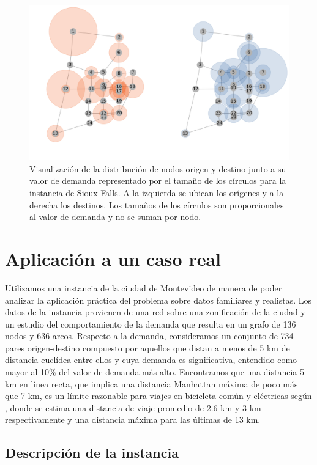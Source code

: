 \begin{figure}[h!]
  \centering
  \includegraphics[width=12cm]{../resources/sioux_falls_demand.png}
  \caption{Visualización de la distribución de nodos origen y destino junto a su valor de demanda representado por el tamaño de los círculos para la instancia de Sioux-Falls. A la izquierda se ubican los orígenes y a la derecha los destinos. Los tamaños de los círculos son proporcionales al valor de demanda y no se suman por nodo.}
  \label{fig:sioux_falls_demand}
\end{figure}

\FloatBarrier
\section{Aplicación a un caso real}

Utilizamos una instancia de la ciudad de Montevideo de manera de poder analizar la aplicación práctica del problema sobre datos familiares y realistas. Los datos de la instancia provienen de una red sobre una zonificación de la ciudad y un estudio del comportamiento de la demanda que resulta en un grafo de 136 nodos y 636 arcos. Respecto a la demanda, consideramos un conjunto de 734 pares origen-destino compuesto por aquellos que distan a menos de 5 km de distancia euclídea entre ellos y cuya demanda es significativa, entendido como mayor al 10\% del valor de demanda más alto. Encontramos que una distancia 5 km en línea recta, que implica una distancia Manhattan máxima de poco más que 7 km, es un límite razonable para viajes en bicicleta común y eléctricas según \cite{anette2018}, donde se estima una distancia de viaje promedio de 2.6 km y 3 km respectivamente y una distancia máxima para las últimas de 13 km.

\subsection{Descripción de la instancia}

